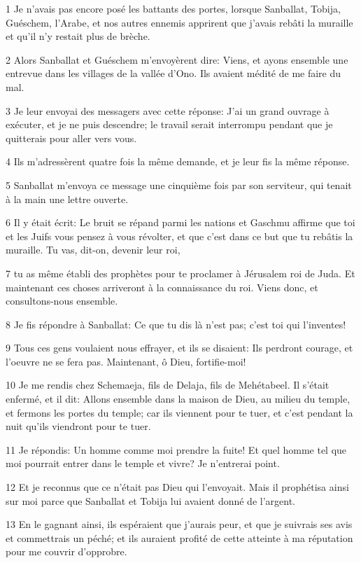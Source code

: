 \par 1 Je n'avais pas encore posé les battants des portes, lorsque Sanballat, Tobija, Guéschem, l'Arabe, et nos autres ennemis apprirent que j'avais rebâti la muraille et qu'il n'y restait plus de brèche.
\par 2 Alors Sanballat et Guéschem m'envoyèrent dire: Viens, et ayons ensemble une entrevue dans les villages de la vallée d'Ono. Ils avaient médité de me faire du mal.
\par 3 Je leur envoyai des messagers avec cette réponse: J'ai un grand ouvrage à exécuter, et je ne puis descendre; le travail serait interrompu pendant que je quitterais pour aller vers vous.
\par 4 Ils m'adressèrent quatre fois la même demande, et je leur fis la même réponse.
\par 5 Sanballat m'envoya ce message une cinquième fois par son serviteur, qui tenait à la main une lettre ouverte.
\par 6 Il y était écrit: Le bruit se répand parmi les nations et Gaschmu affirme que toi et les Juifs vous pensez à vous révolter, et que c'est dans ce but que tu rebâtis la muraille. Tu vas, dit-on, devenir leur roi,
\par 7 tu as même établi des prophètes pour te proclamer à Jérusalem roi de Juda. Et maintenant ces choses arriveront à la connaissance du roi. Viens donc, et consultons-nous ensemble.
\par 8 Je fis répondre à Sanballat: Ce que tu dis là n'est pas; c'est toi qui l'inventes!
\par 9 Tous ces gens voulaient nous effrayer, et ils se disaient: Ils perdront courage, et l'oeuvre ne se fera pas. Maintenant, ô Dieu, fortifie-moi!
\par 10 Je me rendis chez Schemaeja, fils de Delaja, fils de Mehétabeel. Il s'était enfermé, et il dit: Allons ensemble dans la maison de Dieu, au milieu du temple, et fermons les portes du temple; car ils viennent pour te tuer, et c'est pendant la nuit qu'ils viendront pour te tuer.
\par 11 Je répondis: Un homme comme moi prendre la fuite! Et quel homme tel que moi pourrait entrer dans le temple et vivre? Je n'entrerai point.
\par 12 Et je reconnus que ce n'était pas Dieu qui l'envoyait. Mais il prophétisa ainsi sur moi parce que Sanballat et Tobija lui avaient donné de l'argent.
\par 13 En le gagnant ainsi, ils espéraient que j'aurais peur, et que je suivrais ses avis et commettrais un péché; et ils auraient profité de cette atteinte à ma réputation pour me couvrir d'opprobre.
